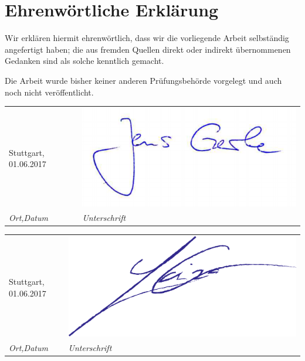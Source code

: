 {}
\section*{Ehrenwörtliche Erklärung}

Wir erklären hiermit ehrenwörtlich, dass wir die vorliegende Arbeit selbständig angefertigt
haben; die aus fremden Quellen direkt oder indirekt übernommenen Gedanken sind als solche
kenntlich gemacht.

Die Arbeit wurde bisher keiner anderen Prüfungsbehörde vorgelegt und auch noch nicht
veröffentlicht. 

\vspace{1cm}
    
\begin{tabular}{p{}p{}}
	Stuttgart, 01.06.2017	& \includegraphics[width=0.5\linewidth]{bilder/erkl/jens}\\
	\textit{Ort,Datum }                             & \textit{Unterschrift}
\end{tabular}

\vspace{0.5cm}
\begin{tabular}{p{}p{}}
	Stuttgart, 01.06.2017	& \includegraphics[width=0.5\linewidth]{bilder/erkl/yaiza}\\
	\textit{Ort,Datum }                             & \textit{Unterschrift}
\end{tabular}